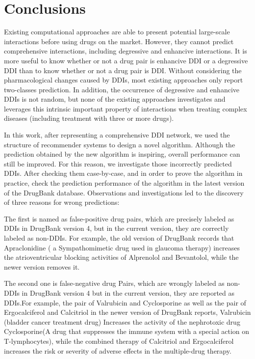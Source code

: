 \documentclass{bmcart}
\begin{document}
\section*{Conclusions}
Existing computational approaches are able to present potential large-scale interactions before using drugs on the market. However, they cannot predict comprehensive interactions, including degressive and enhancive interactions. It is more useful to know whether or not a drug pair is enhancive DDI or a degressive DDI  than to know whether or not a drug pair is DDI. Without considering the pharmacological changes caused by DDIs, most existing approaches only report two-classes prediction.  In addition, the occurrence of degressive and enhancive DDIs is not random, but none of the existing approaches investigates and leverages this intrinsic important property of interactions when treating complex diseases (including treatment with three or more drugs).

In this work, after representing a comprehensive DDI network, we used the structure of recommender systems to design a novel algorithm. Although the prediction obtained by the new algorithm is inspiring, overall performance can still be improved. For this reason, we investigate those incorrectly predicted DDIs. After checking them case-by-case, and in order to prove the algorithm in practice, check the prediction performance of the algorithm in the latest version of the DrugBank database. Observations and investigations led to the discovery of three reasons for wrong predictions:

The first is named as false-positive drug pairs, which are precisely labeled as DDIs in DrugBank version 4, but in the current version, they are correctly labeled as non-DDIs. For example, the old version of DrugBank records that Apraclonidine ( a Sympathomimetic drug used in glaucoma therapy) increases the atrioventricular blocking activities of Alprenolol and Bevantolol, while the newer version removes it.

The second one is false-negative drug Pairs, which are wrongly labeled as non-DDIs in DrugBank version 4  but in the current version, they are reported as DDIs.For example, the pair of Valrubicin and Cyclosporine as well as the pair of Ergocalciferol and  Calcitriol in the newer version of DrugBank reports, Valrubicin (bladder cancer treatment drug) Increases the activity of the nephrotoxic drug Cyclosporine(A drug that suppresses the immune system with a special action on T-lymphocytes), while the combined therapy of Calcitriol and Ergocalciferol increases the risk or severity of adverse effects in the multiple-drug therapy.
\end{document}
